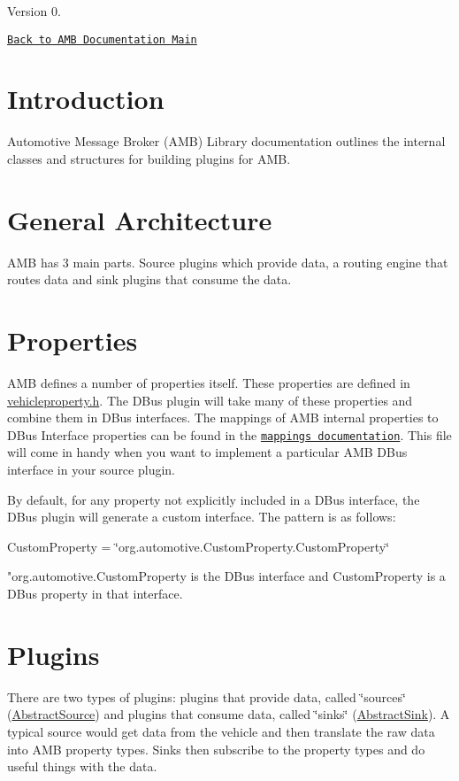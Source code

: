 \begin{DoxyVersion}{Version}
0.
\end{DoxyVersion}
\href{../../html/index.html}{\tt Back to A\+M\+B Documentation Main}\hypertarget{index_intro}{}\section{Introduction}\label{index_intro}
Automotive Message Broker (A\+M\+B) Library documentation outlines the internal classes and structures for building plugins for A\+M\+B.\hypertarget{index_architecture}{}\section{General Architecture}\label{index_architecture}
A\+M\+B has 3 main parts. Source plugins which provide data, a routing engine that routes data and sink plugins that consume the data.\hypertarget{index_properties}{}\section{Properties}\label{index_properties}
A\+M\+B defines a number of properties itself. These properties are defined in \hyperlink{vehicleproperty_8h_source}{vehicleproperty.\+h}. The D\+Bus plugin will take many of these properties and combine them in D\+Bus interfaces. The mappings of A\+M\+B internal properties to D\+Bus Interface properties can be found in the \href{ambdbusmappings_8idl.html}{\tt mappings documentation}. This file will come in handy when you want to implement a particular A\+M\+B D\+Bus interface in your source plugin.

By default, for any property not explicitly included in a D\+Bus interface, the D\+Bus plugin will generate a custom interface. The pattern is as follows\+:

Custom\+Property = \char`\"{}org.\+automotive.\+Custom\+Property.\+Custom\+Property\char`\"{}

"org.\+automotive.\+Custom\+Property is the D\+Bus interface and Custom\+Property is a D\+Bus property in that interface.\hypertarget{index_plugins}{}\section{Plugins}\label{index_plugins}
There are two types of plugins\+: plugins that provide data, called \char`\"{}sources\char`\"{} (\hyperlink{classAbstractSource}{Abstract\+Source}) and plugins that consume data, called \char`\"{}sinks\char`\"{} (\hyperlink{classAbstractSink}{Abstract\+Sink}). A typical source would get data from the vehicle and then translate the raw data into A\+M\+B property types. Sinks then subscribe to the property types and do useful things with the data.

